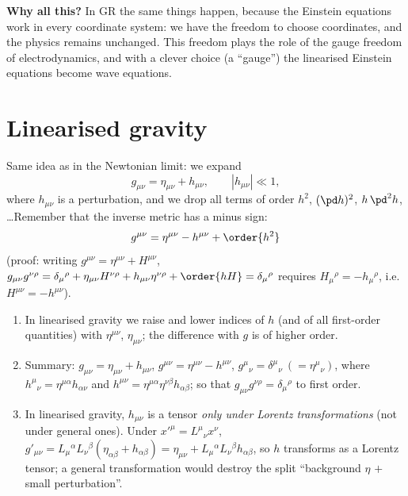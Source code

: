 \textbf{Why all this?} In GR the same things happen, because the Einstein equations work in every coordinate system: we have the freedom to choose coordinates, and the physics remains unchanged. This freedom plays the role of the gauge freedom of electrodynamics, and with a clever choice (a ``gauge'') the linearised Einstein equations become wave equations.

\section{Linearised gravity}

Same idea as in the Newtonian limit: we expand
\begin{equation}
  g_{\mu\nu}=\eta_{\mu\nu}+h_{\mu\nu},\qquad|h_{\mu\nu}|\ll1 ,
\end{equation}
where $h_{\mu\nu}$ is a perturbation, and we drop all terms of order $h^2$, $(\pd h)^2$, $h\,\pd^2h$, \dots Remember that the inverse metric has a minus sign:
\begin{equation}
  g^{\mu\nu}=\eta^{\mu\nu}-h^{\mu\nu}+\order{h^2}
\end{equation}
(proof: writing $g^{\mu\nu}=\eta^{\mu\nu}+H^{\mu\nu}$, $g_{\mu\nu}g^{\nu\rho}=\delta_\mu{}^\rho+\eta_{\mu\nu}H^{\nu\rho}+h_{\mu\nu}\eta^{\nu\rho}+\order{hH}=\delta_\mu{}^\rho$ requires $H_\mu{}^\rho=-h_\mu{}^\rho$, i.e.\ $H^{\mu\nu}=-h^{\mu\nu}$).

\begin{remarkbox}[Remarks]
\begin{enumerate}[label=(\roman*),nosep]
\item In linearised gravity we raise and lower indices of $h$ (and of all first-order quantities) with $\eta^{\mu\nu}$, $\eta_{\mu\nu}$; the difference with $g$ is of higher order.
\item Summary: $g_{\mu\nu}=\eta_{\mu\nu}+h_{\mu\nu}$, $g^{\mu\nu}=\eta^{\mu\nu}-h^{\mu\nu}$, $g^\mu{}_\nu=\delta^\mu{}_\nu\ (=\eta^\mu{}_\nu)$, where $h^\mu{}_\nu=\eta^{\mu\alpha}h_{\alpha\nu}$ and $h^{\mu\nu}=\eta^{\mu\alpha}\eta^{\nu\beta}h_{\alpha\beta}$; so that $g_{\mu\nu}g^{\nu\rho}=\delta_\mu{}^\rho$ to first order.
\item In linearised gravity, $h_{\mu\nu}$ is a tensor \emph{only under Lorentz transformations} (not under general ones). Under $x'^\mu=L^\mu{}_\nu x^\nu$, $g'_{\mu\nu}=L_\mu{}^\alpha L_\nu{}^\beta(\eta_{\alpha\beta}+h_{\alpha\beta})=\eta_{\mu\nu}+L_\mu{}^\alpha L_\nu{}^\beta h_{\alpha\beta}$, so $h$ transforms as a Lorentz tensor; a general transformation would destroy the split ``background $\eta$ $+$ small perturbation''.
\end{enumerate}
\end{remarkbox}

